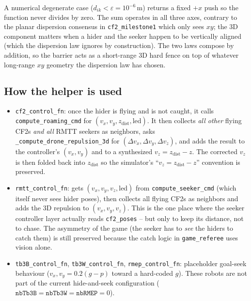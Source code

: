 \documentclass[11pt,a4paper]{article}
\newcommand{\code}[1]{\texttt{#1}}
\begin{document}
A numerical degenerate case ($d_{ik} < \varepsilon = 10^{-6}$\,m) returns a
fixed $+x$ push so the function never divides by zero. The sum operates in
all three axes, contrary to the planar dispersion consensus in
\code{cf2\_milestone1} which only sees $xy$; the 3D component matters when a
hider and the seeker happen to be vertically aligned (which the dispersion
law ignores by construction). The two laws compose by addition, so the
barrier acts as a short-range 3D hard fence on top of whatever long-range
$xy$ geometry the dispersion law has chosen.

\subsection{How the helper is used}

\begin{itemize}[leftmargin=1.4em]
  \item \code{cf2\_control\_fn}: once the hider is flying and is not caught,
        it calls \code{compute\_roaming\_cmd} for $(v_x, v_y, z_\mathrm{dist},
        \text{led})$. It then collects \emph{all other} flying CF2s
        \emph{and all} RMTT seekers as neighbors, asks
        \code{\_compute\_drone\_repulsion\_3d} for $(\Delta v_x, \Delta v_y,
        \Delta v_z)$, and adds the result to the controller's $(v_x, v_y)$
        and to a synthesized $v_z = z_\mathrm{dist} - z$. The corrected
        $v_z$ is then folded back into $z_\mathrm{dist}$ so the simulator's
        ``$v_z = z_\mathrm{dist} - z$'' convention is preserved.
  \item \code{rmtt\_control\_fn}: gets $(v_x, v_y, v_z, \text{led})$ from
        \code{compute\_seeker\_cmd} (which itself never sees hider poses),
        then collects all flying CF2s as neighbors and adds the 3D
        repulsion to $(v_x, v_y, v_z)$. This is the one place where the
        seeker controller layer actually reads \code{cf2\_poses} -- but only
        to keep its distance, not to chase. The asymmetry of the game (the
        seeker has to \emph{see} the hiders to catch them) is still preserved
        because the catch logic in \code{game\_referee} uses vision alone.
  \item \code{tb3B\_control\_fn}, \code{tb3W\_control\_fn},
        \code{rmep\_control\_fn}: placeholder goal-seek behaviour
        ($v_x, v_y = 0.2(g - p)$ toward a hard-coded $g$). These robots are
        not part of the current hide-and-seek configuration
        ($\code{nbTb3B} = \code{nbTb3W} = \code{nbRMEP} = 0$).
\end{itemize}
\end{document}
